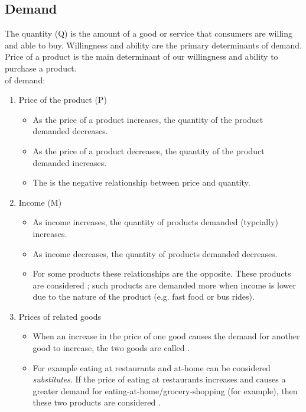 \documentclass{article}
\begin{document}
\subsection{Demand}

The quantity (Q)  is the amount of a good or service that consumers are willing and able to buy. Willingness and ability are the primary determinants of demand. Price of a product is the main determinant of our willingness and ability to purchase a product. \\ 

 of demand: 
\begin{enumerate}
  \item Price of the product (P) \\ 
    \begin{itemize}
      \item As the price of a product increases, the quantity of the product demanded decreases. \\ 
      \item As the price of a product decreases, the quantity of the product demanded increases. \\ 
      \item The  is the negative relationship between price and quantity. 
    \end{itemize}
  \item Income (M)
    \begin{itemize}
      \item As income increases, the quantity of products demanded (typcially) increases. 
      \item As income decreases, the quantity of products demanded decreases. 
      \item For some products these relationships are the opposite. These products are considered ; such products are demanded more when income is lower due to the nature of the product (e.g. fast food or bus rides). 
    \end{itemize}
  \item Prices of related goods 
    \begin{itemize}
      \item When an increase in the price of one good causes the demand for another good to increase, the two goods are called . 
      \item For example eating at restaurants and at-home can be considered \emph{substitutes}. If the price of eating at restaurants increases and causes a greater demand for eating-at-home/grocery-shopping (for example), then these two products are considered . 

\end{itemize}
\end{enumerate}
\end{document}
